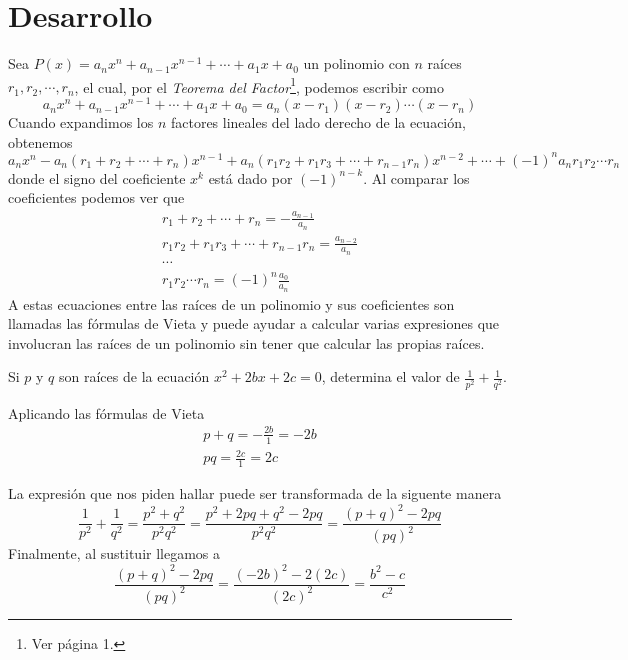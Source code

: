 \section{Desarrollo}
{
    \begin{section-definition}
        Sea $P(x) = a_n x^n + a_{n - 1} x^{n - 1} + \cdots  + a_1 x + a_0$ un polinomio con $n$ raíces $r_1, r_2, \cdots, r_n$,
        el cual, por el \textit{Teorema del Factor}\footnote{Ver \cite{TD23-clase2} página 1.}, podemos escribir como
        \[a_n x^n + a_{n - 1} x^{n - 1} + \cdots  + a_1 x + a_0 = a_n (x - r_1)(x - r_2) \cdots (x - r_n)\]
        Cuando expandimos los $n$ factores lineales del lado derecho de la ecuación, obtenemos
        \[a_n x^n - a_n(r_1 + r_2 + \cdots + r_n)x^{n - 1} + a_n(r_1 r_2 + r_1 r_3 + \cdots + r_{n - 1} r_n)x^{n - 2} + \cdots + (-1)^n a_n r_1 r_2 \cdots r_n\]
        donde el signo del coeficiente $x^k$ está dado por $(-1)^{n - k}$. Al comparar los coeficientes podemos ver que
        \begin{gather*}
            r_1 + r_2 + \cdots + r_n = - \frac{a_{n - 1}}{a_n}\\
            r_1 r_2 + r_1 r_3 + \cdots + r_{n - 1} r_n = \frac{a_{n - 2}}{a_n}\\
            \cdots\\
            r_1 r_2 \cdots r_n = (-1)^n \frac{a_0}{a_n}
        \end{gather*}
        A estas ecuaciones entre las raíces de un polinomio y sus coeficientes son llamadas las fórmulas de Vieta y puede
        ayudar a calcular varias expresiones que involucran las raíces de un polinomio sin tener que calcular las propias raíces.
    \end{section-definition}
    \newpage
    \begin{example}
        Si $p$ y $q$ son raíces de la ecuación $x^2 + 2bx + 2c = 0$, determina el valor de $\frac{1}{p^2} + \frac{1}{q^2}.$

        \solution
        {
            Aplicando las fórmulas de Vieta
            \begin{gather*}
                p + q = - \frac{2b}{1} = - 2b \\
                pq = \frac{2c}{1} = 2c
            \end{gather*}

            La expresión que nos piden hallar puede ser transformada de la siguente manera
            \[\frac{1}{p^2} + \frac{1}{q^2} = \frac{p^2 + q^2}{p^2 q^2} = \frac{p^2 + 2pq + q^2 - 2pq}{p^2 q^2} = \frac{ (p + q)^2 - 2pq}{(pq)^2}\]
            Finalmente, al sustituir llegamos a
            \[\frac{ (p + q)^2 - 2pq}{(pq)^2} = \frac{ (-2b)^2 - 2(2c)}{(2c)^2} = \boxed{\frac{b^2 - c}{c^2}}\]
        }
    \end{example}

}
